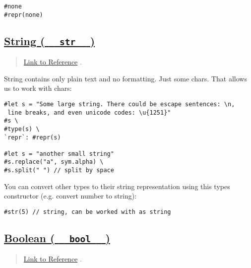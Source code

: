\begin{verbatim}
#none
#repr(none)
\end{verbatim}

\pandocbounded{}

\subsection{\texorpdfstring{\hyperref[string-str]{String (
\texttt{\ }{\texttt{\ str\ }}\texttt{\ }
)}}{String (   str   )}}\label{string-str}

\begin{quote}
\href{https://typst.app/docs/reference/foundations/str/}{Link to
Reference} .
\end{quote}

String contains only plain text and no formatting. Just some chars. That
allows us to work with chars:

\begin{verbatim}
#let s = "Some large string. There could be escape sentences: \n,
 line breaks, and even unicode codes: \u{1251}"
#s \
#type(s) \
`repr`: #repr(s)

#let s = "another small string"
#s.replace("a", sym.alpha) \
#s.split(" ") // split by space
\end{verbatim}

\pandocbounded{}

You can convert other types to their string representation using this
type\textquotesingle s constructor (e.g. convert number to string):

\begin{verbatim}
#str(5) // string, can be worked with as string
\end{verbatim}

\pandocbounded{}

\subsection{\texorpdfstring{\hyperref[boolean-bool]{Boolean (
\texttt{\ }{\texttt{\ bool\ }}\texttt{\ }
)}}{Boolean (   bool   )}}\label{boolean-bool}

\begin{quote}
\href{https://typst.app/docs/reference/foundations/bool/}{Link to
Reference} .
\end{quote}


